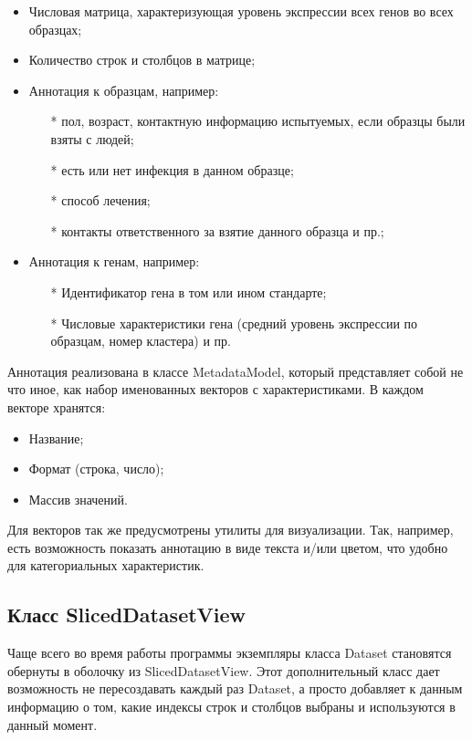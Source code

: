 \documentclass[annotation,specification]{itmo-student-thesis}
\begin{document}
\begin{itemize}
\item Числовая матрица, характеризующая уровень экспрессии всех генов во всех образцах;
\item Количество строк и столбцов в матрице;
\item Аннотация к образцам, например:\begin{itemize}
    \item[*] пол, возраст, контактную информацию испытуемых, если образцы были взяты с людей;
    \item[*] есть или нет инфекция в данном образце;
    \item[*] способ лечения;
    \item[*]  контакты ответственного за взятие данного образца и пр.;\end{itemize}
\item Аннотация к генам, например:\begin{itemize}
    \item[*] Идентификатор гена в том или ином стандарте;
    \item[*] Числовые характеристики гена (средний уровень экспрессии по образцам, номер кластера) и пр.\end{itemize}
\end{itemize}

Аннотация реализована в классе MetadataModel, который представляет собой не что иное, как набор именованных векторов с характеристиками. В каждом векторе хранятся:

\begin{itemize}
\item Название;
\item Формат (строка, число);
\item Массив значений.
\end{itemize}

Для векторов так же предусмотрены утилиты для визуализации. Так, например, есть возможность показать аннотацию в виде текста и/или цветом, что удобно для категориальных характеристик. 

\subsection{Класс SlicedDatasetView}
Чаще всего во время работы программы экземпляры класса Dataset становятся обернуты в оболочку из SlicedDatasetView. Этот дополнительный класс дает возможность не пересоздавать каждый раз Dataset, а просто добавляет к данным информацию о том, какие индексы строк и столбцов выбраны и используются в данный момент.
\end{document}
